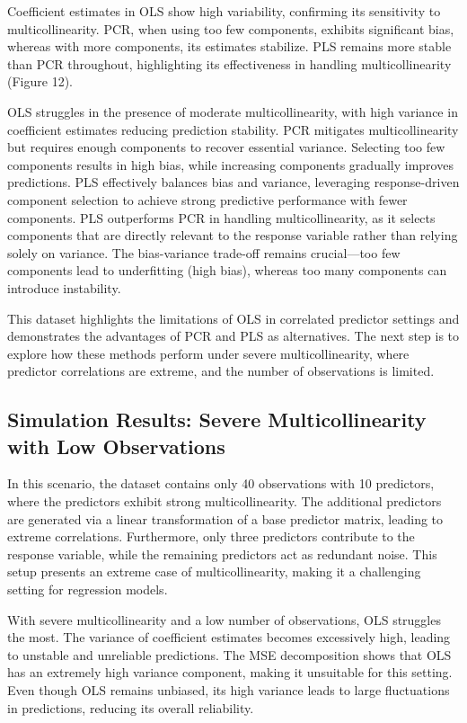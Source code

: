 \documentclass[11pt,twoside,a4paper]{article}
\begin{document}
Coefficient estimates in OLS show high variability, confirming its sensitivity to multicollinearity. PCR, when using too few components, exhibits significant bias, whereas with more components, its estimates stabilize. PLS remains more stable than PCR throughout, highlighting its effectiveness in handling multicollinearity (Figure 12).

OLS struggles in the presence of moderate multicollinearity, with high variance in coefficient estimates reducing prediction stability. PCR mitigates multicollinearity but requires enough components to recover essential variance. Selecting too few components results in high bias, while increasing components gradually improves predictions. PLS effectively balances bias and variance, leveraging response-driven component selection to achieve strong predictive performance with fewer components. PLS outperforms PCR in handling multicollinearity, as it selects components that are directly relevant to the response variable rather than relying solely on variance. The bias-variance trade-off remains crucial—too few components lead to underfitting (high bias), whereas too many components can introduce instability.

This dataset highlights the limitations of OLS in correlated predictor settings and demonstrates the advantages of PCR and PLS as alternatives. The next step is to explore how these methods perform under severe multicollinearity, where predictor correlations are extreme, and the number of observations is limited.

\subsection{Simulation Results: Severe Multicollinearity with Low Observations}  

In this scenario, the dataset contains only 40 observations with 10 predictors, where the predictors exhibit strong multicollinearity. The additional predictors are generated via a linear transformation of a base predictor matrix, leading to extreme correlations. Furthermore, only three predictors contribute to the response variable, while the remaining predictors act as redundant noise. This setup presents an extreme case of multicollinearity, making it a challenging setting for regression models.

With severe multicollinearity and a low number of observations, OLS struggles the most. The variance of coefficient estimates becomes excessively high, leading to unstable and unreliable predictions. The MSE decomposition shows that OLS has an extremely high variance component, making it unsuitable for this setting. Even though OLS remains unbiased, its high variance leads to large fluctuations in predictions, reducing its overall reliability.
\end{document}
